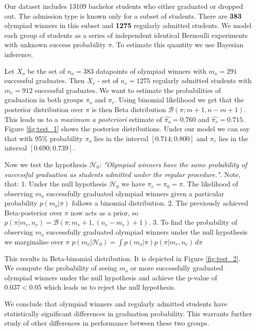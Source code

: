 \documentclass{article}
\begin{document}
Our dataset includes 13109 bachelor students who either graduated or dropped out. The admission type is known only for a subset of students. There are \textbf{383} olympiad winners in this subset and \textbf{1275} regularly admitted students. We model each group of students as a series of independent identical Bernoulli experiments with unknown success probability $\pi$. To estimate this quantity we use Bayesian inference.

Let $X_o$ be the set of $n_o = 383$ datapoints of olympiad winners with $m_o = 291$ successful graduates. Then $X_r$ - set of $n_r = 1275$ regularly admitted students with $m_r = 912$ successful graduates.
We want to estimate the probabilities of graduation in both groups $\pi_o$ and $\pi_r$. Using binomial likelihood we get that the posterior distribution over $\pi$ is then Beta distribution $\mathcal{B}(\pi ; m+1,n-m+1)$. This leads us to a \textit{maximum a posteriori} estimate of
$\hat{\pi_o} = 0.760$ and
$\hat{\pi_r} = 0.715$. Figure \ref{fig:test_1} shows the posterior distributions.
Under our model we can say that with 95\% probability $\pi_o$ lies in the interval $[0.714;0.800]$ and $\pi_r$ lies in the interval $[0.690;0.739]$.

Now we test the hypothesis $\mathcal{H}_0$: \textit{"Olympiad winners have the same probability of successful graduation as students admitted under the regular procedure."}. Note, that: 1. Under the null hypothesis $\mathcal{H}_0$ we have $\pi_r = \pi_0 = \pi$. The likelihood of observing $m_o$ successfully graduated olympiad winners given a particular probability $p(m_o| \pi)$ follows a binomial distribution. 2. The previously achieved Beta-posterior over $\pi$ now acts as a prior, so $ p(\pi | m_r, n_r) = \mathcal{B}(\pi;m_r+1, (n_r - m_r) + 1)$. 3. To find the probability of observing $m_o$ successfully graduated olympiad winners under the null hypothesis we marginalise over $\pi$ $p(m_o | \mathcal{H}_0) = \int p(m_o | \pi) p(\pi | m_r, n_r)\,d\pi$

This results in Beta-binomial distribution. \cite{hyp_testing} It is depicted in Figure \ref{fig:test_2}. 
We compute the probability of seeing $m_o$ or more successfully graduated olympiad winners under the null hypothesis and achieve the p-value of $0.037 < 0.05$ which leads us to reject the null hypothesis.

We conclude that olympiad winners and regularly admitted students have statistically significant differences in graduation probability. This warrants further study of other differences in performance between these two groups.
\end{document}
